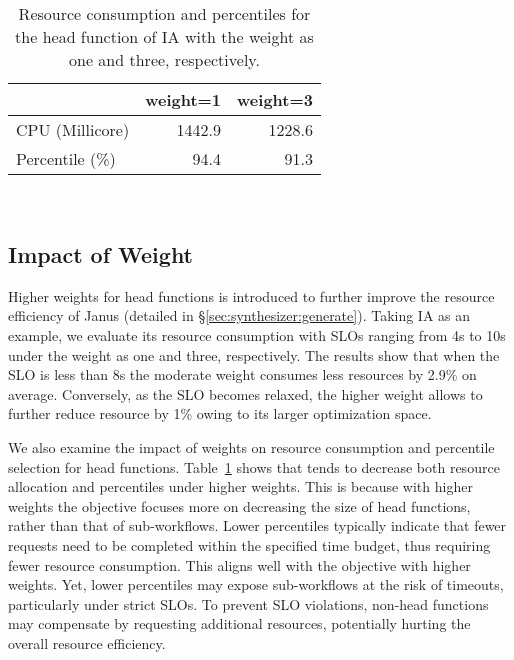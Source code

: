 \begin{table}[!t]
        \small
	\centering
	\caption{Resource consumption and percentiles for the head function of IA with the weight as one and three, respectively.}
	\begin{tabular}{@{}l r r @{}}
		\toprule
		{} &  \textbf{weight=1}  & \textbf{weight=3} \\
		\midrule
		CPU (Millicore)  & 1442.9  & 1228.6    \\
		Percentile (\%)  & 94.4 & 91.3  \\
		\bottomrule 
	\end{tabular}\\
	\label{table:exp:micro:weight}
\end{table}

\subsection{Impact of Weight}
\label{exp:micro:weight}
Higher weights for head functions is introduced to further improve the resource efficiency of Janus (detailed in \S\ref{sec:synthesizer:generate}).
Taking IA as an example, we evaluate its resource consumption with SLOs ranging from 4s to 10s under the weight as one and three, respectively.
The results show that when the SLO is less than 8s the moderate weight consumes less resources by 2.9\% on average.
Conversely, as the SLO becomes relaxed, the higher weight allows to further reduce resource by 1\% owing to its larger optimization space.

We also examine the impact of weights on resource consumption and percentile selection for head functions.
Table~\ref{table:exp:micro:weight} shows that \namex tends to decrease both resource allocation and percentiles under higher weights.
This is because with higher weights the objective focuses more on decreasing the size of head functions, rather than that of sub-workflows.
Lower percentiles typically indicate that fewer requests need to be completed within the specified time budget, thus requiring fewer resource consumption.
This aligns well with the objective with higher weights.
Yet, lower percentiles may expose sub-workflows at the risk of timeouts, particularly under strict SLOs.
To prevent SLO violations, non-head functions may compensate by requesting additional resources, potentially hurting the overall resource efficiency.



